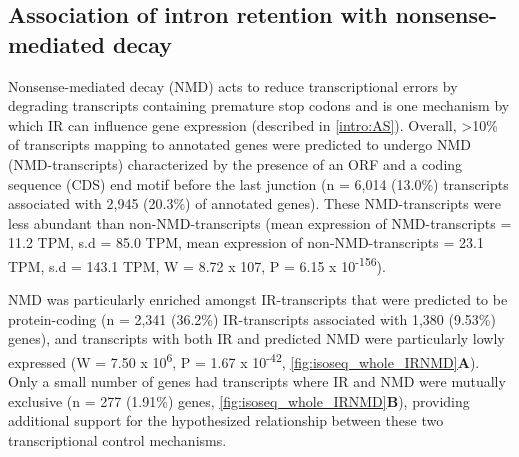 \subsection{Association of intron retention with nonsense-mediated decay}
\label{ch4: IR}
Nonsense-mediated decay (NMD) acts to reduce transcriptional errors by degrading transcripts containing premature stop codons\cite{Hug2015} and is one mechanism by which IR can influence gene expression\cite{Pan2006} (described in \cref{intro:AS}). Overall, >10\% of transcripts mapping to annotated genes were predicted to undergo NMD (NMD-transcripts) characterized by the presence of an ORF and a coding sequence (CDS) end motif before the last junction (n = 6,014 (13.0\%) transcripts associated with 2,945 (20.3\%) of annotated genes). These NMD-transcripts were less abundant than non-NMD-transcripts (mean expression of NMD-transcripts = 11.2 TPM, s.d =  85.0 TPM, mean expression of non-NMD-transcripts = 23.1 TPM, s.d = 143.1 TPM, W = 8.72 x 107, P = 6.15 x 10\textsuperscript{-156}).  

NMD was particularly enriched amongst IR-transcripts that were predicted to be protein-coding (n = 2,341 (36.2\%) IR-transcripts associated with 1,380 (9.53\%) genes), and transcripts with both IR and predicted NMD were particularly lowly expressed (W = 7.50 x 10\textsuperscript{6}, P = 1.67 x 10\textsuperscript{-42}, \cref{fig:isoseq_whole_IRNMD}\textbf{A}). Only a small number of genes had transcripts where IR and NMD were mutually exclusive (n = 277 (1.91\%) genes, \cref{fig:isoseq_whole_IRNMD}\textbf{B}), providing additional support for the hypothesized relationship between these two transcriptional control mechanisms\cite{Ge2014}. 


